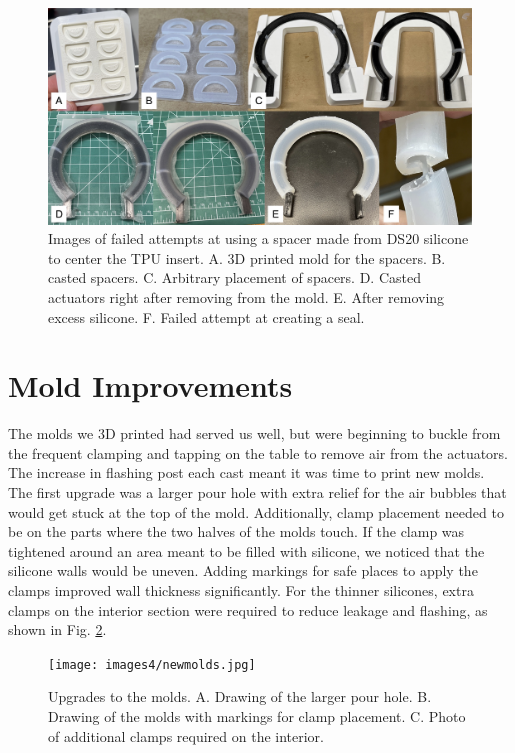 \begin{figure}[h]
    \centering
    \includegraphics[width=6 in]{images4/ds20spacer.jpg}
    \caption{Images of failed attempts at using a spacer made from DS20 silicone to center the TPU insert. A. 3D printed mold for the spacers. B. casted spacers. C. Arbitrary placement of spacers. D. Casted actuators right after removing from the mold. E. After removing excess silicone. F. Failed attempt at creating a seal.}
    \label{fig:ds20spacer}
\end{figure}

\section{Mold Improvements}
The molds we 3D printed had served us well, but were beginning to buckle from the frequent clamping and tapping on the table to remove air from the actuators. The increase in flashing post each cast meant it was time to print new molds. The first upgrade was a larger pour hole with extra relief for the air bubbles that would get stuck at the top of the mold. Additionally, clamp placement needed to be on the parts where the two halves of the molds touch. If the clamp was tightened around an area meant to be filled with silicone, we noticed that the silicone walls would be uneven. Adding markings for safe places to apply the clamps improved wall thickness significantly. For the thinner silicones, extra clamps on the interior section were required to reduce leakage and flashing, as shown in Fig. \ref{fig:newmolds}.

\begin{figure}[h]
    \centering
    \texttt{[image: images4/newmolds.jpg]}
    \caption{Upgrades to the molds. A. Drawing of the larger pour hole. B. Drawing of the molds with markings for clamp placement. C. Photo of additional clamps required on the interior.}
    \label{fig:newmolds}
\end{figure}

